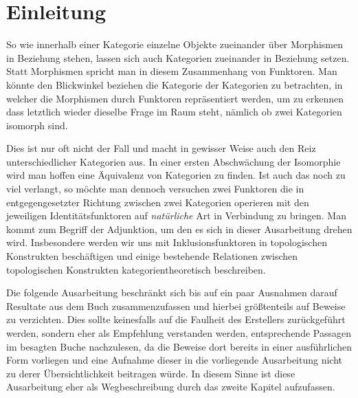 \section*{Einleitung}

So wie innerhalb einer Kategorie einzelne Objekte zueinander über Morphismen in Beziehung stehen, lassen sich auch Kategorien zueinander in Beziehung setzen. Statt Morphismen spricht man in diesem Zusammenhang von Funktoren. Man könnte den Blickwinkel beziehen die Kategorie der Kategorien zu betrachten, in welcher die Morphismen durch Funktoren repräsentiert werden, um zu erkennen dass letztlich wieder dieselbe Frage im Raum steht, nämlich ob zwei Kategorien isomorph sind.

Dies ist nur oft nicht der Fall und macht in gewisser Weise auch den Reiz unterschiedlicher Kategorien aus. In einer ersten Abschwächung der Isomorphie wird man hoffen eine Äquivalenz von Kategorien zu finden. Ist auch das noch zu viel verlangt, so möchte man dennoch versuchen zwei Funktoren die in entgegengesetzter Richtung zwischen zwei Kategorien operieren mit den jeweiligen Identitätsfunktoren auf \emph{natürliche} Art in Verbindung zu bringen. Man kommt zum Begriff der Adjunktion, um den es sich in dieser Ausarbeitung drehen wird. Insbesondere werden wir uns mit Inklusionsfunktoren in topologischen Konstrukten beschäftigen und einige bestehende Relationen zwischen topologischen Konstrukten kategorientheoretisch beschreiben.

Die folgende Ausarbeitung beschränkt sich bis auf ein paar Ausnahmen darauf Resultate aus dem Buch \cite{preuss} zusammenzufassen und hierbei größtenteils auf Beweise zu verzichten. 
Dies sollte keinesfalls auf die Faulheit des Erstellers zurückgeführt werden, sondern eher als Empfehlung verstanden werden, entsprechende Passagen im besagten Buche nachzulesen, da die Beweise dort bereits in einer ausführlichen Form vorliegen und eine Aufnahme dieser in die vorliegende Ausarbeitung nicht zu derer Übersichtlichkeit beitragen würde.
In diesem Sinne ist diese Ausarbeitung eher als Wegbeschreibung durch das zweite Kapitel aufzufassen.
